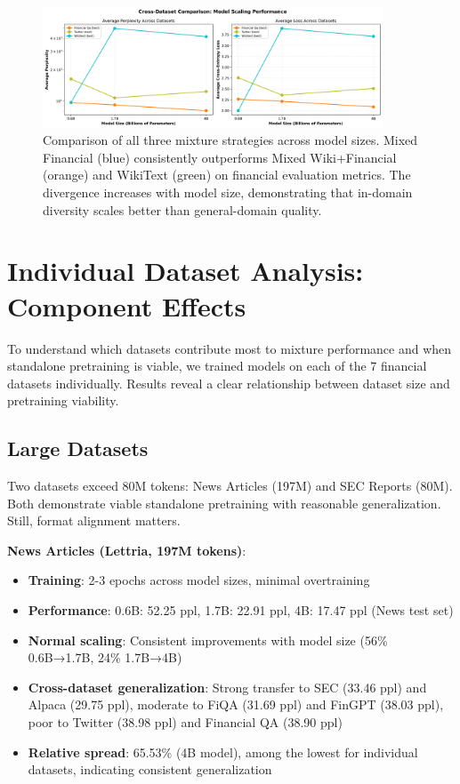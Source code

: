 \begin{figure}[h]
\centering
\includegraphics[width=0.9\textwidth]{figures/scaling_comparison_all.png}
\caption[Comparison of Mixture Strategies]{Comparison of all three mixture strategies across model sizes. Mixed Financial (blue) consistently outperforms Mixed Wiki+Financial (orange) and WikiText (green) on financial evaluation metrics. The divergence increases with model size, demonstrating that in-domain diversity scales better than general-domain quality.}
\label{fig:scaling_comparison_all}
\end{figure}

\section{Individual Dataset Analysis: Component Effects}

To understand which datasets contribute most to mixture performance and when standalone pretraining is viable, we trained models on each of the 7 financial datasets individually. Results reveal a clear relationship between dataset size and pretraining viability.

\subsection{Large Datasets}

Two datasets exceed 80M tokens: News Articles (197M) and SEC Reports (80M). Both demonstrate viable standalone pretraining with reasonable generalization. Still, format alignment matters.

\textbf{News Articles (Lettria, 197M tokens)}:
\begin{itemize}
\item \textbf{Training}: 2-3 epochs across model sizes, minimal overtraining
\item \textbf{Performance}: 0.6B: 52.25 ppl, 1.7B: 22.91 ppl, 4B: 17.47 ppl (News test set)
\item \textbf{Normal scaling}: Consistent improvements with model size (56\% 0.6B→1.7B, 24\% 1.7B→4B)
\item \textbf{Cross-dataset generalization}: Strong transfer to SEC (33.46 ppl) and Alpaca (29.75 ppl), moderate to FiQA (31.69 ppl) and FinGPT (38.03 ppl), poor to Twitter (38.98 ppl) and Financial QA (38.90 ppl)
\item \textbf{Relative spread}: 65.53\% (4B model), among the lowest for individual datasets, indicating consistent generalization
\end{itemize}

